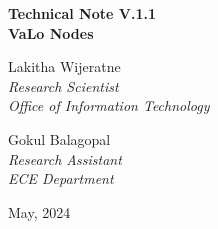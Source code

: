 \documentclass[12pt]{article}
\newcommand{\pubnumber}{1.1}
\newcommand{\monthyear}{May, 2024}
\begin{document}


\begin{titlepage}
\begin{flushright}
\LARGE{\textbf{Technical Note  V.\pubnumber}}\\
\vfill 
\Huge{\textbf{\textbf{VaLo} Nodes}}\\
\vfill

\normalsize Lakitha Wijeratne\\
\textit{Research Scientist}\\
\textit{Office of Information Technology}\\
\vspace{12pt}

\normalsize Gokul Balagopal\\
\textit{Research Assistant}\\
\textit{ECE Department}\\
\vspace{12pt}

\vfill

\vfill
\normalsize \monthyear
\vfill


\end{flushright}
\end{titlepage}
\end{document}
